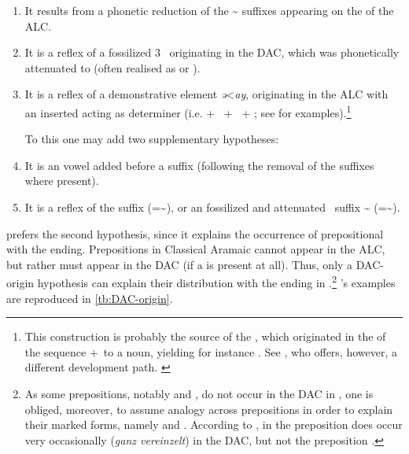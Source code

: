 \begin{enumerate}

\item It results from a phonetic reduction of the \~  suffixes appearing on the \prim of the ALC.

\item It is a reflex of a fossilized 3\masc\   originating in the DAC, which was phonetically attenuated to  (often realised as \phonetic[ɪ] or \phonetic[ɘ]).

\item It is a reflex of a demonstrative element \textit{ə}<\textit{ay}, originating in the ALC with an inserted  acting as determiner (i.e. \prim + \dem\ + \lnk\ + \secn; see  for \Syr examples).\footnote{This construction is probably the source of the  \Midn {}, which originated in the  of the sequence +\poss\ to a \prim noun, yielding for instance . See \textcites[52, \S 47]{JastrowMidin}[58]{JastrowLehrbuch}, who offers, however, a different development path. \label{ft:Midn_ayd} }

To this one may add two supplementary hypotheses:

\item It is an  vowel added before a  suffix (following the removal of the  suffixes where present).

\item It is a reflex of the \Sor \ez* suffix  (=\phonetic[i]\~\phonetic[ɪ]), or an   fossilized and attenuated \masc\ \ez* suffix \~ (=\phonetic[e]\~\phonetic[i]).

\end{enumerate}

\citet[380]{MengozziExtended} prefers the second hypothesis, since it explains the occurrence of prepositional \prims with the \ed ending. Prepositions in Classical Aramaic cannot appear in the ALC, but rather must appear in the DAC (if a \lnk* is present at all). Thus, only a DAC-origin hypothesis can explain their distribution with the \ed ending in .\footnote{As some prepositions, notably  and , do not occur in the DAC in \Syr, one is obliged, moreover, to assume analogy across prepositions in order to explain their \cst* marked forms, namely  and . According to \citet[330, \S 231]{NoldekeMandaic}, in \CMand the preposition  does occur {very occasionally} (\textit{ganz vereinzelt}) in the DAC, but not the preposition  \citep[see also][112]{PatElStudies}.} \citeauthor{MengozziExtended}'s examples are reproduced in \vref{tb:DAC-origin}.

